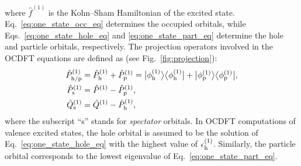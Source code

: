 \documentclass{article}
\begin{document}
where $\hat{f}^{(1)} $ is the Kohn--Sham Hamiltonian of the excited state.
Eq.~\eqref{eq:one_state_occ_eq} determines the occupied orbitals, while Eqs.~\eqref{eq:one_state_hole_eq} and \eqref{eq:one_state_part_eq} determine the hole and particle orbitals, respectively.
The projection operators involved in the OCDFT equations are defined as (see Fig.~\ref{fig:projection}):
\begin{align}
\hat{P}^{(1)}_{\rm h/p} &= \hat{P}^{(1)}_{\rm h} + \hat{P}^{(1)}_{\rm p} = 
\ket[1]{\phi^{(1)}_{\rm h}}\bra[1]{\phi^{(1)}_{\rm h}}
+\ket[1]{\phi^{(1)}_{\rm p}}\bra[1]{\phi^{(1)}_{\rm p}},\\
\hat{P}^{(1)}_{\rm s} &= \hat{P}^{(1)} - \hat{P}^{(1)}_{\rm p},\\
\hat{Q}^{(1)}_{\rm s} &= \hat{Q}^{(1)} - \hat{P}^{(1)}_{\rm h},
\end{align}
where the subscript ``s'' stands for \textit{spectator} orbitals.
In OCDFT computations of valence excited states, the hole orbital is assumed to be the solution of Eq.~\eqref{eq:one_state_hole_eq} with the highest value of $\epsilon^{(1)}_{\rm h}$.  Similarly, the particle orbital corresponds to the lowest eigenvalue of Eq.~\eqref{eq:one_state_part_eq}.
\end{document}
